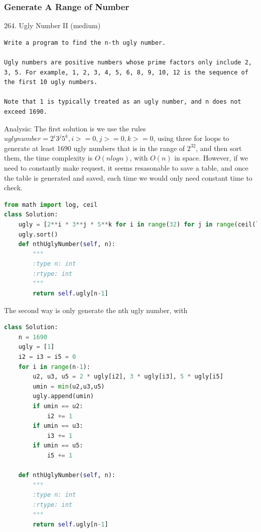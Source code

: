 \documentclass[../main.tex]{subfiles}
\begin{document}
\subsubsection{Generate A Range of Number}
264. Ugly Number II (medium)
\begin{lstlisting}
Write a program to find the n-th ugly number.

Ugly numbers are positive numbers whose prime factors only include 2, 3, 5. For example, 1, 2, 3, 4, 5, 6, 8, 9, 10, 12 is the sequence of the first 10 ugly numbers.

Note that 1 is typically treated as an ugly number, and n does not exceed 1690.
\end{lstlisting}
Analysis: The first solution is we use the rules $ugly number = 2^i3^j5^k, i>=0, j>=0, k>=0$, using three for loops to generate at least 1690 ugly numbers that is in the range of $2^32$, and then sort them, the time complexity is $O(nlogn)$, with $O(n)$ in space.  However, if we need to constantly make request, it seems resasonable to save a table, and once the table is generated and saved, each time we would only need constant time to check.
\begin{lstlisting}[language = Python]
from math import log, ceil
class Solution:
    ugly = [2**i * 3**j * 5**k for i in range(32) for j in range(ceil(log(2**32, 3))) for k in range(ceil(log(2**32, 5)))]
    ugly.sort()
    def nthUglyNumber(self, n):
        """
        :type n: int
        :rtype: int
        """
        return self.ugly[n-1]
\end{lstlisting}
The second way is only generate the nth ugly number, with 
\begin{lstlisting}[language=Python]
class Solution:
    n = 1690
    ugly = [1]
    i2 = i3 = i5 = 0
    for i in range(n-1):
        u2, u3, u5 = 2 * ugly[i2], 3 * ugly[i3], 5 * ugly[i5]
        umin = min(u2,u3,u5)
        ugly.append(umin)
        if umin == u2:
            i2 += 1
        if umin == u3:
            i3 += 1
        if umin == u5:
            i5 += 1

    def nthUglyNumber(self, n):
        """
        :type n: int
        :rtype: int
        """   
        return self.ugly[n-1]
\end{lstlisting}
\end{document}
